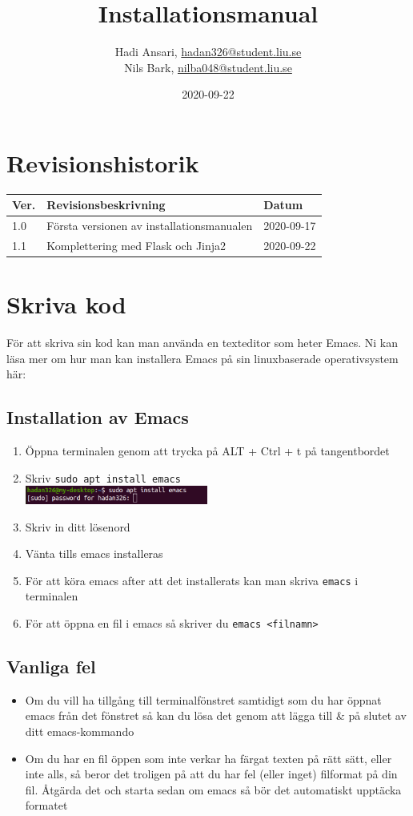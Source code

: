 \documentclass{TDP003mall}
\author{Hadi Ansari, \url{hadan326@student.liu.se}\\
  Nils Bark, \url{nilba048@student.liu.se}}
\title{Installationsmanual}
\date{2020-09-22}
\begin{document}
\projectpage
\section{Revisionshistorik}
\begin{table}[!h]
\begin{tabularx}{\linewidth}{|l|X|l|}
\hline
Ver. & Revisionsbeskrivning & Datum \\\hline
1.0 & Första versionen av installationsmanualen & 2020-09-17 \\\hline
1.1 & Komplettering med Flask och Jinja2 & 2020-09-22 \\\hline
\end{tabularx}
\end{table}


\section{Skriva kod}
För att skriva sin kod kan man använda en texteditor som heter Emacs. Ni kan läsa mer om hur man kan installera Emacs på sin linuxbaserade operativsystem här:


\subsection*{Installation av Emacs}

\begin{enumerate}
   \item Öppna terminalen genom att trycka på ALT + Ctrl + t på tangentbordet
   \item Skriv \texttt{sudo apt install emacs}\\
     \includegraphics[width=60mm]{emacs_install}
   \item Skriv in ditt lösenord
   \item Vänta tills emacs installeras
   \item För att köra emacs after att det installerats kan man skriva \texttt{emacs} i terminalen
   \item För att öppna en fil i emacs så skriver du \texttt{emacs <filnamn>} 
\end{enumerate}

\subsection*{Vanliga fel}
\begin{itemize}
\item Om du vill ha tillgång till terminalfönstret samtidigt som du har öppnat emacs från det fönstret så kan du lösa det genom att lägga till \& på slutet av ditt emacs-kommando
\item Om du har en fil öppen som inte verkar ha färgat texten på rätt sätt, eller inte alls, så beror det troligen på att du har fel (eller inget) filformat på din fil. Åtgärda det och starta sedan om emacs så bör det automatiskt upptäcka formatet
\end{itemize}
\end{document}
